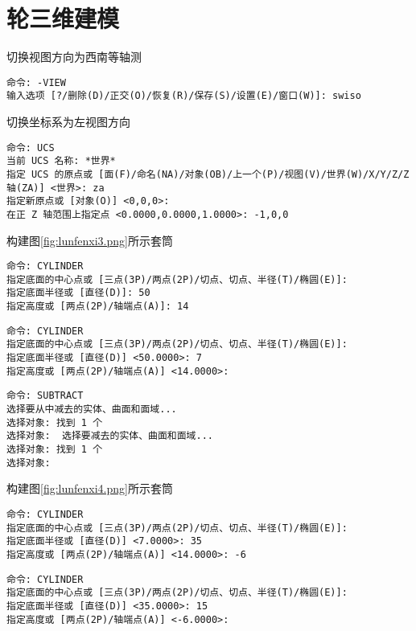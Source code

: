 \section{轮三维建模}
\begin{procedure}
\item 切换视图方向为西南等轴测

\begin{lstlisting}
命令: -VIEW
输入选项 [?/删除(D)/正交(O)/恢复(R)/保存(S)/设置(E)/窗口(W)]: swiso
\end{lstlisting}

\item 切换坐标系为左视图方向

\begin{lstlisting}
命令: UCS
当前 UCS 名称: *世界*
指定 UCS 的原点或 [面(F)/命名(NA)/对象(OB)/上一个(P)/视图(V)/世界(W)/X/Y/Z/Z 轴(ZA)] <世界>: za
指定新原点或 [对象(O)] <0,0,0>:
在正 Z 轴范围上指定点 <0.0000,0.0000,1.0000>: -1,0,0
\end{lstlisting}

\item 构建图\ref{fig:lunfenxi3.png}所示套筒

\begin{lstlisting}
命令: CYLINDER
指定底面的中心点或 [三点(3P)/两点(2P)/切点、切点、半径(T)/椭圆(E)]:
指定底面半径或 [直径(D)]: 50
指定高度或 [两点(2P)/轴端点(A)]: 14
\end{lstlisting}

\begin{lstlisting}
命令: CYLINDER
指定底面的中心点或 [三点(3P)/两点(2P)/切点、切点、半径(T)/椭圆(E)]:
指定底面半径或 [直径(D)] <50.0000>: 7
指定高度或 [两点(2P)/轴端点(A)] <14.0000>:
\end{lstlisting}

\begin{lstlisting}
命令: SUBTRACT
选择要从中减去的实体、曲面和面域...
选择对象: 找到 1 个
选择对象:  选择要减去的实体、曲面和面域...
选择对象: 找到 1 个
选择对象:
\end{lstlisting}

\item 构建图\ref{fig:lunfenxi4.png}所示套筒

\begin{lstlisting}
命令: CYLINDER
指定底面的中心点或 [三点(3P)/两点(2P)/切点、切点、半径(T)/椭圆(E)]:
指定底面半径或 [直径(D)] <7.0000>: 35
指定高度或 [两点(2P)/轴端点(A)] <14.0000>: -6
\end{lstlisting}

\begin{lstlisting}
命令: CYLINDER
指定底面的中心点或 [三点(3P)/两点(2P)/切点、切点、半径(T)/椭圆(E)]:
指定底面半径或 [直径(D)] <35.0000>: 15
指定高度或 [两点(2P)/轴端点(A)] <-6.0000>:
\end{lstlisting}


\end{procedure}

